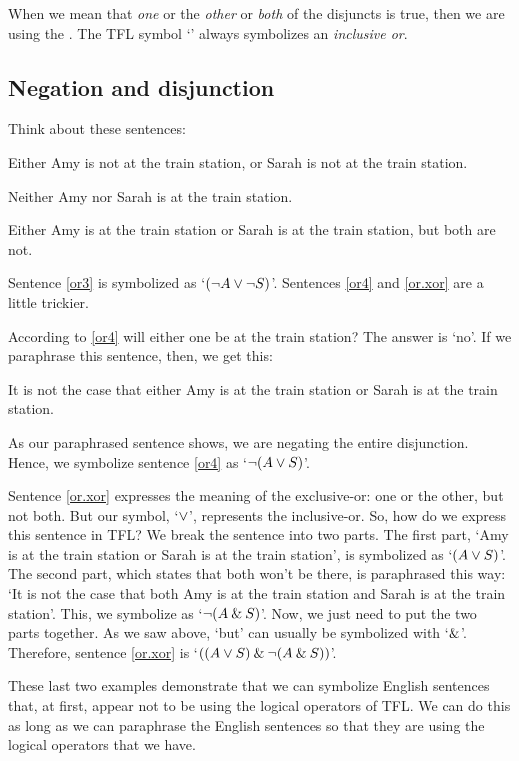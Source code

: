 When we mean that \textit{one} or the \textit{other} or \textit{both} of the disjuncts is true, then we are using the . The TFL symbol `\eor' always symbolizes an \emph{inclusive or}.

\subsection{Negation and disjunction}

Think about these sentences:
	\begin{earg}
		\item[\ex{or3}] Either Amy is not at the train station, or Sarah is not at the train station.
		\item[\ex{or4}] Neither Amy nor Sarah is at the train station.
		\item[\ex{or.xor}] Either Amy is at the train station or Sarah is at the train station, but both are not.
	\end{earg}
Sentence \ref{or3} is symbolized as `$({\neg} A \vee {\neg} S)$'. Sentences \ref{or4} and \ref{or.xor} are a little trickier. 

According to \ref{or4} will either one be at the train station? The answer is `no'. If we paraphrase this sentence, then, we get this: 
\begin{ebullet}
	\item[] It is not the case that either Amy is at the train station or Sarah is at the train station. 
\end{ebullet}
As our paraphrased sentence shows, we are negating the entire disjunction. Hence, we symbolize sentence \ref{or4} as `${\neg} (A \vee S)$'. 

Sentence \ref{or.xor} expresses the meaning of the exclusive-or: one or the other, but not both. But our symbol, `$\vee$', represents the inclusive-or. So, how do we express this sentence in TFL? We break the sentence into two parts. The first part, `Amy is at the train station or Sarah is at the train station', is symbolized as `$(A \vee S)$'. The second part, which states that both won't be there, is paraphrased this way: `It is not the case that both Amy is at the train station and Sarah is at the train station'. This, we symbolize as `${\neg}(A \mathbin{\&} S)$'. Now, we just need to put the two parts together. As we saw above, `but' can usually be symbolized with `$\mathbin{\&}$'. Therefore, sentence \ref{or.xor} is `$((A \vee S) \mathbin{\&}  {\neg}(A \mathbin{\&} S))$'.

These last two examples demonstrate that we can symbolize English sentences that, at first, appear not to be using the logical operators of TFL. We can do this as long as we can paraphrase the English sentences so that they are using the logical operators that we have. 


